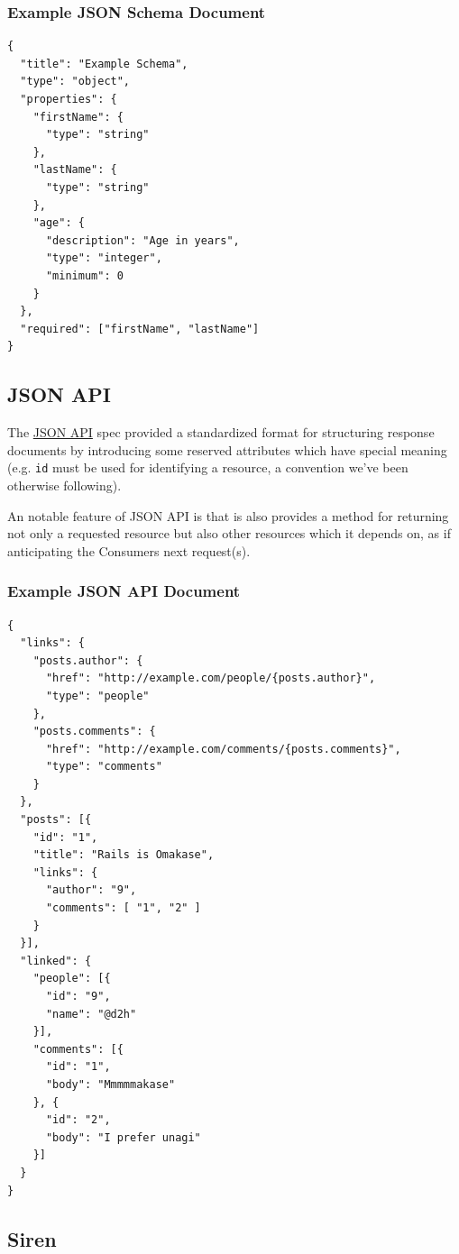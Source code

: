 \documentclass{book}
\begin{document}
\subsubsection{Example JSON Schema Document}

\begin{verbatim}
{
  "title": "Example Schema",
  "type": "object",
  "properties": {
    "firstName": {
      "type": "string"
    },
    "lastName": {
      "type": "string"
    },
    "age": {
      "description": "Age in years",
      "type": "integer",
      "minimum": 0
    }
  },
  "required": ["firstName", "lastName"]
}
\end{verbatim}

\subsection{JSON API}

The \href{http://jsonapi.org/}{JSON API} \cite{JSONAPI} spec provided a standardized format for structuring response documents by introducing some reserved attributes which have special meaning (e.g. \texttt{id} must be used for identifying a resource, a convention we've been otherwise following).

An notable feature of JSON API is that is also provides a method for returning not only a requested resource but also other resources which it depends on, as if anticipating the Consumers next request(s).

\subsubsection{Example JSON API Document}

\begin{verbatim}
{
  "links": {
    "posts.author": {
      "href": "http://example.com/people/{posts.author}",
      "type": "people"
    },
    "posts.comments": {
      "href": "http://example.com/comments/{posts.comments}",
      "type": "comments"
    }
  },
  "posts": [{
    "id": "1",
    "title": "Rails is Omakase",
    "links": {
      "author": "9",
      "comments": [ "1", "2" ]
    }
  }],
  "linked": {
    "people": [{
      "id": "9",
      "name": "@d2h"
    }],
    "comments": [{
      "id": "1",
      "body": "Mmmmmakase"
    }, {
      "id": "2",
      "body": "I prefer unagi"
    }]
  }
}
\end{verbatim}

\subsection{Siren}
\end{document}
